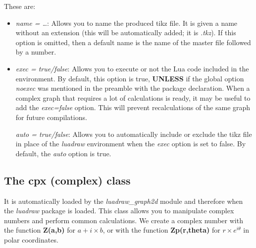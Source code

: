 These are:
\begin{itemize}
\item \emph{name = \ldots{}}: Allows you to name the produced tikz file. It is given a name without an extension (this will be automatically added; it is \emph{.tkz}). If this option is omitted, then a default name is the name of the master file followed by a number.
\item \emph{exec = true/false}: Allows you to execute or not the Lua code included in the environment. By default, this option is true, \textbf{UNLESS} if the global option \emph{noexec} was mentioned in the preamble with the package declaration. When a complex graph that requires a lot of calculations is ready, it may be useful to add the \emph{exec=false} option. This will prevent recalculations of the same graph for future compilations.

\emph{auto = true/false}: Allows you to automatically include or exclude the tikz file in place of the \emph{luadraw} environment when the \emph{exec} option is set to false. By default, the \emph{auto} option is true.

\end{itemize}

\subsection{The cpx (complex) class}

It is automatically loaded by the \emph{luadraw\_graph2d} module and therefore when the \emph{luadraw} package is loaded. This class allows you to manipulate complex numbers and perform common calculations. We create a complex number with the function \textbf{Z(a,b)} for \(a + i\times b\), or with the function \textbf{Zp(r,theta)} for \(r\times e^{i\theta}\) in polar coordinates.

